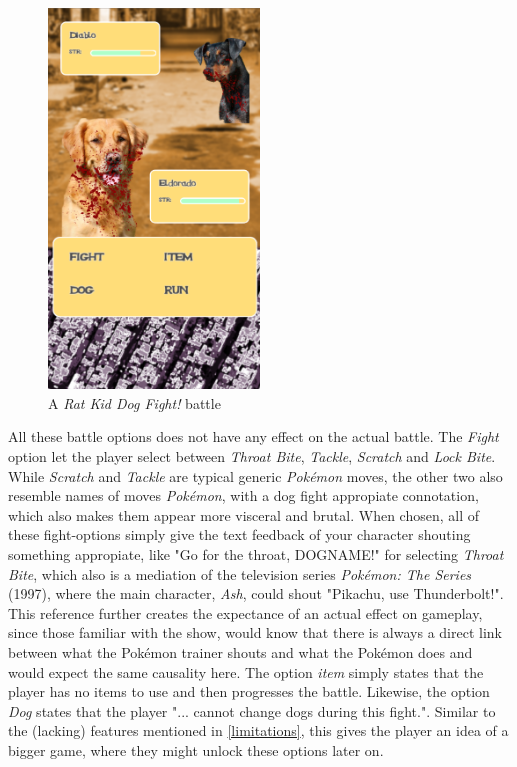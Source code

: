 \begin{figure}[h!]
	\centering
    \includegraphics[width=0.5\textwidth]{battle.png}
    \caption{A \textit{Rat Kid Dog Fight!} battle}
    \label{fig:DogFightBattle}
\end{figure}

All these battle options does not have any effect on the actual battle. The \textit{Fight} option let the player select between \textit{Throat Bite}, \textit{Tackle}, \textit{Scratch} and \textit{Lock Bite}. While \textit{Scratch} and \textit{Tackle} are typical generic \textit{Pokémon} moves, the other two also resemble names of moves \textit{Pokémon}, with a dog fight appropiate connotation, which also makes them appear more visceral and brutal. When chosen, all of these fight-options simply give the text feedback of your character shouting something appropiate, like "Go for the throat, DOGNAME!" for selecting \textit{Throat Bite}, which also is a mediation of the television series \textit{Pokémon: The Series} (1997), where the main character, \textit{Ash}, could shout "Pikachu, use Thunderbolt!". This reference further creates the expectance of an actual effect on gameplay, since those familiar with the show, would know that there is always a direct link between what the Pokémon trainer shouts and what the Pokémon does and would expect the same causality here.
The option \textit{item} simply states that the player has no items to use and then progresses the battle. Likewise, the option \textit{Dog} states that the player "... cannot change dogs during this fight.". Similar to the (lacking) features mentioned in \ref{limitations}, this gives the player an idea of a bigger game, where they might unlock these options later on.\\

